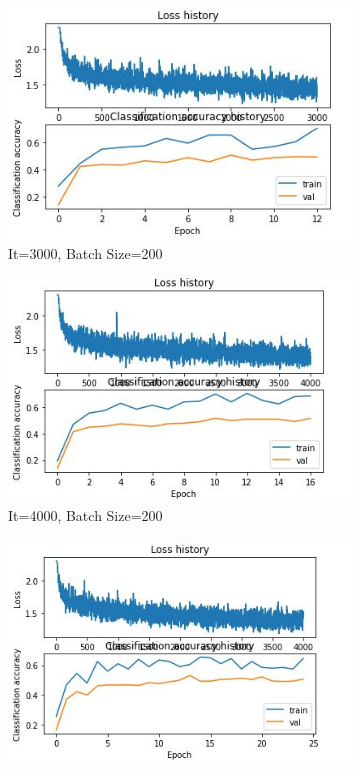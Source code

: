 \documentclass[
	12pt, %
]{fphw}
\begin{document}
\begin{figure}[h!]
\begin{subfigure}[b]{0.2\textwidth}
         \includegraphics[width=\textwidth]{img/Img_3.JPG}
         \caption{It=3000, Batch Size=200}
     \end{subfigure}
     \hfill
     \begin{subfigure}[b]{0.2\textwidth}
         \centering
         \includegraphics[width=\textwidth]{img/Img_4.JPG}
         \caption{It=4000, Batch Size=200}
     \end{subfigure}
      \hfill
     \begin{subfigure}[b]{0.2\textwidth}
         \centering
         \includegraphics[width=\textwidth]{img/img_5.JPG}

\end{subfigure}
\end{figure}
\end{document}
